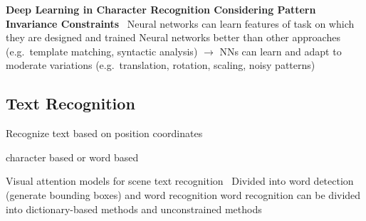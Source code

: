 \textbf{Deep Learning in Character Recognition Considering Pattern Invariance
Constraints}~\citep{oyedotun_deep_2015}
Neural networks can learn features of task on which they are designed and trained
Neural networks better than other approaches (e.g.\ template matching, syntactic analysis)
$\rightarrow$ NNs can learn and adapt to moderate variations (e.g.\ translation, rotation, scaling,
noisy patterns)

\subsection*{Text Recognition}
Recognize text based on position coordinates

character based or word based

Visual attention models for scene text recognition~\citep{ghosh_visual_2017}
Divided into word detection (generate bounding boxes) and word recognition
word recognition can be divided into dictionary-based methods and unconstrained methods
